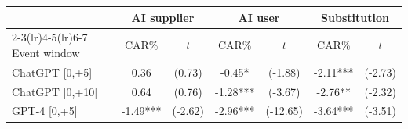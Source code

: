\begin{tabular}{lcccccc}
\toprule
& \multicolumn{2}{c}{AI supplier} & \multicolumn{2}{c}{AI user} & \multicolumn{2}{c}{Substitution} \\
\cmidrule(lr){2-3}\cmidrule(lr){4-5}\cmidrule(lr){6-7}
Event window & CAR\% & $t$ & CAR\% & $t$ & CAR\% & $t$ \\
\midrule
ChatGPT [0,+5] & 0.36 & (0.73) & -0.45* & (-1.88) & -2.11*** & (-2.73) \\
ChatGPT [0,+10] & 0.64 & (0.76) & -1.28*** & (-3.67) & -2.76** & (-2.32) \\
GPT-4 [0,+5] & -1.49*** & (-2.62) & -2.96*** & (-12.65) & -3.64*** & (-3.51) \\
\bottomrule
\end{tabular}